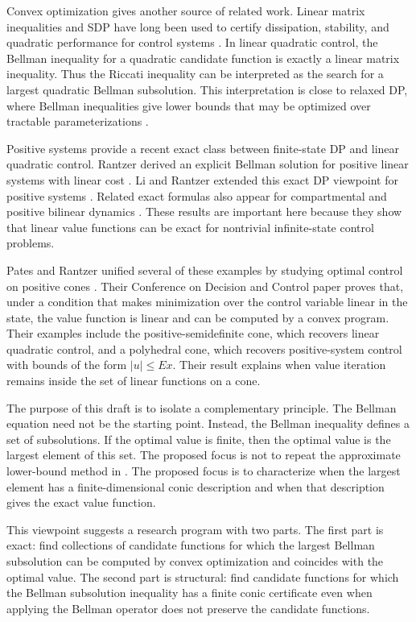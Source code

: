 \documentclass{article}
\begin{document}
Convex optimization gives another source of related work. Linear matrix inequalities and SDP have long been used to certify dissipation, stability, and quadratic performance for control systems \cite{boyd-vandenberghe-2004}. In linear quadratic control, the Bellman inequality for a quadratic candidate function is exactly a linear matrix inequality. Thus the Riccati inequality can be interpreted as the search for a largest quadratic Bellman subsolution. This interpretation is close to relaxed DP, where Bellman inequalities give lower bounds that may be optimized over tractable parameterizations \cite{rantzer-2006}.

Positive systems provide a recent exact class between finite-state DP and linear quadratic control. Rantzer derived an explicit Bellman solution for positive linear systems with linear cost \cite{rantzer-2022}. Li and Rantzer extended this exact DP viewpoint for positive systems \cite{li-rantzer-2024}. Related exact formulas also appear for compartmental and positive bilinear dynamics \cite{blanchini-2023}. These results are important here because they show that linear value functions can be exact for nontrivial infinite-state control problems.

Pates and Rantzer unified several of these examples by studying optimal control on positive cones \cite{pates-rantzer-cdc}. Their Conference on Decision and Control paper proves that, under a condition that makes minimization over the control variable linear in the state, the value function is linear and can be computed by a convex program. Their examples include the positive-semidefinite cone, which recovers linear quadratic control, and a polyhedral cone, which recovers positive-system control with bounds of the form $|u|\leq Ex$. Their result explains when value iteration remains inside the set of linear functions on a cone.

The purpose of this draft is to isolate a complementary principle. The Bellman equation need not be the starting point. Instead, the Bellman inequality defines a set of subsolutions. If the optimal value is finite, then the optimal value is the largest element of this set. The proposed focus is not to repeat the approximate lower-bound method in \cite{wang-odonoghue-boyd-2015}. The proposed focus is to characterize when the largest element has a finite-dimensional conic description and when that description gives the exact value function.

This viewpoint suggests a research program with two parts. The first part is exact: find collections of candidate functions for which the largest Bellman subsolution can be computed by convex optimization and coincides with the optimal value. The second part is structural: find candidate functions for which the Bellman subsolution inequality has a finite conic certificate even when applying the Bellman operator does not preserve the candidate functions.
\end{document}
